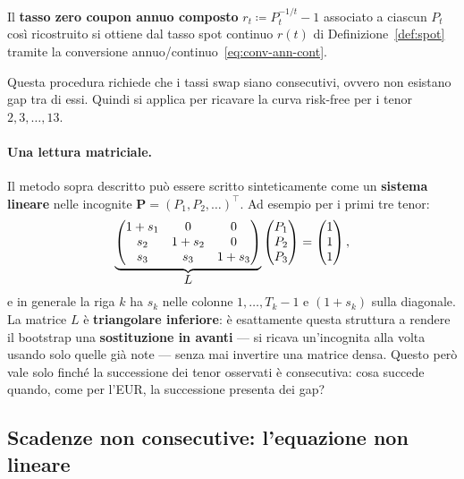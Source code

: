 \documentclass[11pt,a4paper]{article}
\theoremstyle{plain}
\theoremstyle{definition}
\theoremstyle{remark}
\newcommand{\defeq}{\coloneqq}
\begin{document}
Il \textbf{tasso zero coupon annuo composto} $r_t \defeq P_t^{-1/t}-1$ associato a ciascun
$P_t$ cos\`i ricostruito si ottiene dal tasso spot continuo $r(t)$ di
Definizione~\ref{def:spot} tramite la conversione annuo/continuo~\eqref{eq:conv-ann-cont}.

Questa procedura richiede che i tassi swap siano consecutivi, ovvero non esistano gap tra di essi. Quindi si applica per ricavare la curva risk-free per i tenor $2,3,\dots,13$.

\paragraph{Una lettura matriciale.}
Il metodo sopra descritto pu\`o essere scritto sinteticamente come un \textbf{sistema lineare}
nelle incognite $\mathbf P=(P_1,P_2,\ldots)^\top$. Ad esempio per i primi tre tenor:
\begin{equation}
  \label{eq:boot-tri}
  \underbrace{%
  \begin{pmatrix}
    1+s_1 & 0     & 0     \\
    s_2   & 1+s_2 & 0     \\
    s_3   & s_3   & 1+s_3
  \end{pmatrix}}_{\displaystyle L}
  \begin{pmatrix} P_1 \\ P_2 \\ P_3 \end{pmatrix}
  =
  \begin{pmatrix} 1 \\ 1 \\ 1 \end{pmatrix},
\end{equation}
e in generale la riga $k$ ha $s_k$ nelle colonne $1,\dots,T_k-1$ e $(1+s_k)$ sulla diagonale.
La matrice $L$ \`e \textbf{triangolare inferiore}: \`e esattamente questa struttura a rendere il
bootstrap una \textbf{sostituzione in avanti} --- si ricava un'incognita alla volta usando solo
quelle gi\`a note --- senza mai invertire una matrice densa. Questo per\`o vale solo finch\'e
la successione dei tenor osservati \`e consecutiva: cosa succede quando, come per l'EUR, la
successione presenta dei gap?

\subsection{Scadenze non consecutive: l'equazione non lineare}
\label{sec:nonlin}
\end{document}

